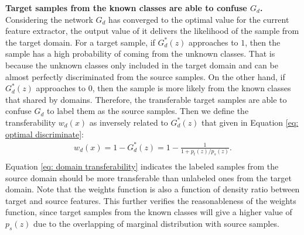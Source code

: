 \textbf{Target samples from the known classes are able to confuse $G_d$.}
Considering the network $G_d$ has converged to the optimal value for the current feature extractor, the output value of it delivers the likelihood of the sample from the target domain. 
For a target sample, if $G_d^*(z)$ approaches to $1$, then the sample has a high probability of coming from the unknown classes.
That is because the unknown classes only included in the target domain and can be almost perfectly discriminated from the source samples. 
On the other hand, if $G_d^*(z)$ approaches to $0$, then the sample is more likely from the known classes that shared by domains. 
Therefore, the transferable target samples are able to confuse $G_d$ to label them as the source samples.
Then we define the transferability $w_d(x)$ as inversely related to $G_d^*(z)$ that given in Equation \ref{eq: optimal discriminate}:
\begin{equation}
    \label{eq: domain transferability}
    \begin{split}
        w_d(x) = 1-G_d^*(z)=  1-\frac{1}{1+p_t(z)/p_s(z)}.\\ 
    \end{split}
\end{equation}
Equation \ref{eq: domain transferability} indicates the labeled samples from the source domain should be more transferable than unlabeled ones from the target domain. 
Note that the weights function is also a function of density ratio between target and source features.
This further verifies the reasonableness of the weights function, since target samples from the known classes will give a higher value of $p_s(z)$ due to the overlapping of marginal distribution with source samples. 


